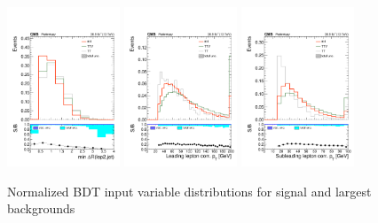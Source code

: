 \begin{figure}[htp]
\centering
\includegraphics[width=0.3\textwidth]{ch8_figs/kinMVA_input_mindr_lep2_jet.pdf}
\includegraphics[width=0.3\textwidth]{ch8_figs/kinMVA_input_LepGood0_conePt.pdf}
\includegraphics[width=0.3\textwidth]{ch8_figs/kinMVA_input_LepGood1_conePt.pdf}
\caption[Signal extraction BDT input variables]{Normalized BDT input variable distributions for signal and largest backgrounds}
\label{fig:inputs2}
\end{figure}

